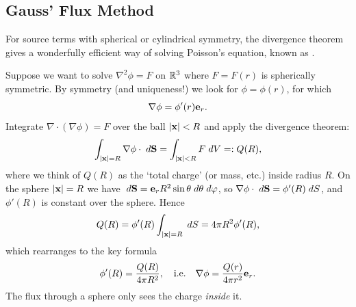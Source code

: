 \documentclass[a4paper]{scrartcl}
\begin{document}
\subsection{Gauss' Flux Method}

For source terms with spherical or cylindrical symmetry, the divergence theorem gives a wonderfully efficient way of solving Poisson's equation, known as .

Suppose we want to solve $\nabla^2 \phi = F$ on $\mathbb{R}^3$ where $F = F(r)$ is spherically symmetric. By symmetry (and uniqueness!) we look for $\phi = \phi(r)$, for which
$$
\nabla \phi = \phi'(r) \mathbf{e}_r.
$$
Integrate $\nabla \cdot (\nabla \phi) = F$ over the ball $|\mathbf{x}| < R$ and apply the divergence theorem:
$$
\int_{|\mathbf{x}| = R} \nabla \phi \cdot \; d \mathbf{S} = \int_{|\mathbf{x}| < R} F \; d V =: Q(R),
$$
where we think of $Q(R)$ as the `total charge' (or mass, etc.) inside radius $R$. On the sphere $|\mathbf{x}| = R$ we have $\; d \mathbf{S} = \mathbf{e}_r R^2 \sin \theta \; d \theta \; d \varphi$, so $\nabla \phi \cdot \; d \mathbf{S} = \phi'(R) \; d S$, and $\phi'(R)$ is constant over the sphere. Hence
$$
Q(R) = \phi'(R) \int_{|\mathbf{x}| = R} \; d S = 4 \pi R^2 \phi'(R),
$$
which rearranges to the key formula
$$
\phi'(R) = \frac{Q(R)}{4 \pi R^2}, \quad \text{i.e.} \quad \nabla \phi = \frac{Q(r)}{4 \pi r^2} \mathbf{e}_r.
$$
The flux through a sphere only sees the charge \emph{inside} it.

\begin{center}
\end{center}
\end{document}
